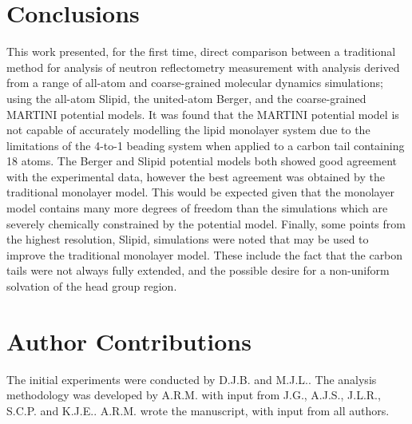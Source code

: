 \documentclass[amsmath,amssymb,twocolumn,superscriptaddress]{revtex4-1}
\begin{document}
\section{Conclusions}
This work presented, for the first time, direct comparison between a
traditional method for analysis of neutron reflectometry measurement with
analysis derived from a range of all-atom and coarse-grained molecular
dynamics simulations; using the all-atom Slipid, the united-atom Berger,
and the coarse-grained MARTINI potential models.
It was found that the MARTINI potential model is not capable of accurately
modelling the lipid monolayer system due to the limitations of the 4-to-1
beading system when applied to a carbon tail containing 18 atoms.
The Berger and Slipid potential models both showed good agreement with the
experimental data, however the best agreement was obtained by the
traditional monolayer model.
This would be expected given that the monolayer model contains many more
degrees of freedom than the simulations which are severely chemically
constrained by the potential model.
Finally, some points from the highest resolution, Slipid, simulations were
noted that may be used to improve the traditional monolayer model.
These include the fact that the carbon tails were not always fully
extended, and the possible desire for a non-uniform solvation of the head
group region.

\section{Author Contributions}
The initial experiments were conducted by D.J.B. and M.J.L..
The analysis methodology was developed by A.R.M. with input from J.G.,
A.J.S., J.L.R., S.C.P. and K.J.E..
A.R.M. wrote the manuscript, with input from all authors.



\end{document}
